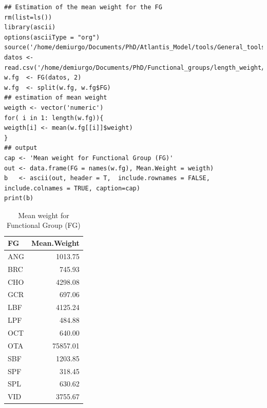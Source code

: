 \documentclass[11pt]{article}
\begin{document}
\begin{verbatim}
## Estimation of the mean weight for the FG
rm(list=ls())
library(ascii)
options(asciiType = "org")
source('/home/demiurgo/Documents/PhD/Atlantis_Model/tools/General_tools/Atlantis_tools.R')
datos <- read.csv('/home/demiurgo/Documents/PhD/Functional_groups/length_weight/length_weight_jf.csv')
w.fg  <- FG(datos, 2)
w.fg  <- split(w.fg, w.fg$FG)
## estimation of mean weight
weigth <- vector('numeric')
for( i in 1: length(w.fg)){
weigth[i] <- mean(w.fg[[i]]$weight)
}
## output
cap <- 'Mean weight for Functional Group (FG)'
out <- data.frame(FG = names(w.fg), Mean.Weight = weigth)
b   <- ascii(out, header = T,  include.rownames = FALSE, include.colnames = TRUE, caption=cap)
print(b)
\end{verbatim}
\begin{table}[htb]
\caption{Mean weight for Functional Group (FG)}
\begin{center}
\begin{tabular}{lr}
 FG   &  Mean.Weight  \\
\hline
 ANG  &      1013.75  \\
 BRC  &       745.93  \\
 CHO  &      4298.08  \\
 GCR  &       697.06  \\
 LBF  &      4125.24  \\
 LPF  &       484.88  \\
 OCT  &       640.00  \\
 OTA  &     75857.01  \\
 SBF  &      1203.85  \\
 SPF  &       318.45  \\
 SPL  &       630.62  \\
 VID  &      3755.67  \\
\end{tabular}
\end{center}
\end{table}
\end{document}
